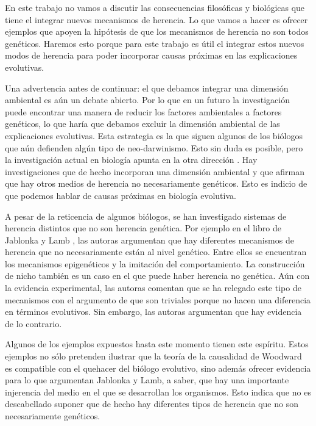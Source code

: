 En este trabajo no vamos a discutir las consecuencias filosóficas y biológicas que tiene el integrar nuevos mecanismos de herencia. Lo que vamos a hacer es ofrecer ejemplos que apoyen la hipótesis de que los mecanismos de herencia no son todos genéticos. Haremos esto porque para este trabajo es útil el integrar estos nuevos modos de herencia para poder incorporar causas próximas en las explicaciones evolutivas.

Una advertencia antes de continuar: el que debamos integrar una dimensión ambiental es aún un debate abierto. Por lo que en un futuro la investigación puede encontrar una manera de reducir los factores ambientales a factores genéticos, lo que haría que debamos excluir la dimensión ambiental de las explicaciones evolutivas. Esta estrategia es la que siguen algunos de los biólogos que aún defienden algún tipo de neo-darwinismo. Esto sin duda es posible, pero la investigación actual en biología apunta en la otra dirección  \cite{Bateson2014}. Hay investigaciones que de hecho incorporan una dimensión ambiental y que afirman que hay otros medios de herencia no necesariamente genéticos. Esto es indicio de que podemos hablar de causas próximas en biología evolutiva.

A pesar de la reticencia de algunos biólogos, se han investigado sistemas de herencia distintos que no son herencia genética. Por ejemplo en el libro de Jablonka y Lamb \citeyear{Jablonka2020}, las autoras argumentan que hay diferentes mecanismos de herencia que no necesariamente están al nivel genético. Entre ellos se encuentran los mecanismos epigenéticos y la imitación del comportamiento. La construcción de nicho también es un caso en el que puede haber herencia no genética. Aún con la evidencia experimental, las autoras comentan que se ha relegado este tipo de mecanismos con el argumento de que son triviales porque no hacen una diferencia en términos evolutivos. Sin embargo, las autoras argumentan que hay evidencia de lo contrario.

Algunos de los ejemplos expuestos hasta este momento tienen este espíritu. Estos ejemplos no sólo pretenden ilustrar que la teoría de la causalidad de Woodward es compatible con el quehacer del biólogo evolutivo, sino además ofrecer evidencia para lo que argumentan Jablonka y Lamb, a saber, que hay una importante injerencia del medio en el que se desarrollan los organismos. Esto indica que no es descabellado suponer que de hecho hay diferentes tipos de herencia que no son necesariamente genéticos.

